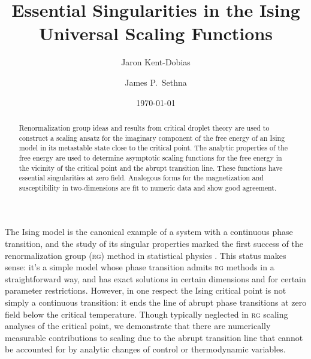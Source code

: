 \documentclass[aps,prl,reprint]{revtex4-1}
\begin{document}
\title{Essential Singularities in the Ising Universal Scaling Functions}
\author{Jaron Kent-Dobias}
\author{James P.~Sethna}

\date\today

\begin{abstract}
  Renormalization group ideas and results from critical droplet theory are
  used to construct a scaling ansatz for the imaginary component of the free
  energy of an Ising model in its metastable state close to the critical
  point. The analytic properties of the free energy are used to determine
  asymptotic scaling functions for the free energy in the vicinity of the
  critical point and the abrupt transition line. These functions have
  essential singularities at zero field. Analogous forms for the magnetization
  and susceptibility in two-dimensions are fit to numeric data and show good
  agreement.
\end{abstract}

\maketitle

The Ising model is the canonical example of a system with a continuous phase
transition, and the study of its singular properties marked the first success
of the renormalization group (\textsc{rg}) method in statistical physics
\cite{wilson.1971.renormalization}. This status makes sense: it's a simple
model whose phase transition admits \textsc{rg} methods in a straightforward way,
and has exact solutions in certain dimensions and for certain parameter
restrictions. However, in one respect the Ising critical point is not simply a
continuous transition: it ends the line of abrupt phase transitions at zero
field below the critical temperature. Though typically neglected in \textsc{rg}
scaling analyses of the critical point, we demonstrate that there are
numerically measurable contributions to scaling due to the abrupt transition
line that cannot be accounted for by analytic changes of control or
thermodynamic variables.
\end{document}
